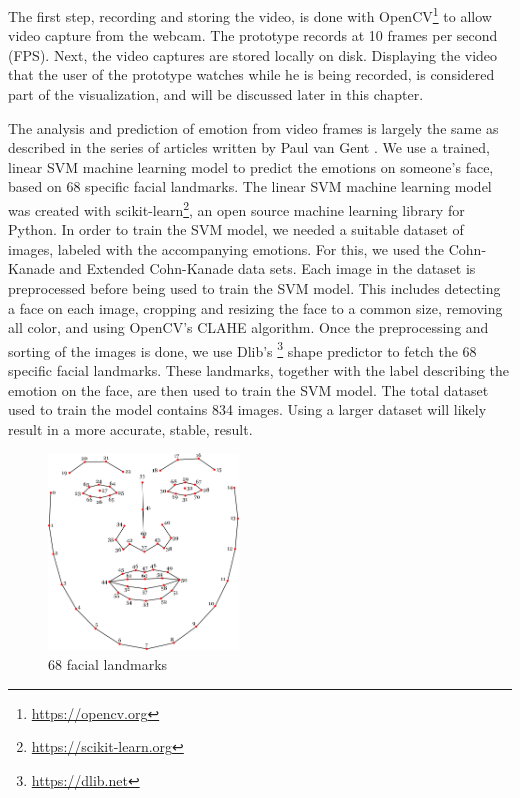 \documentclass[sigconf]{acmart}
\begin{document}
The first step, recording and storing the video, is done with OpenCV\footnote{\url{https://opencv.org}} 
to allow video capture from the webcam. The prototype records at 10 frames per second (FPS).
Next, the video captures are stored locally on disk.
Displaying the video that the user of the prototype watches while he is being recorded, is considered part of
the visualization, and will be discussed later in this chapter.

The analysis and prediction of emotion from video frames is largely the same as described in the series of
articles written by Paul van Gent \cite{gent2016landmarks}. We use a trained, linear SVM machine learning model
to predict the emotions on someone's face, based on 68 specific facial landmarks. The linear SVM machine learning
model was created with scikit-learn\footnote{\url{https://scikit-learn.org}}, an open source machine learning library
for Python. In order to train the SVM model, we needed a suitable dataset of images, labeled with the
accompanying emotions. For this, we used the Cohn-Kanade and Extended Cohn-Kanade 
\cite{kanade2000comprehensive, lucey2010extended} data sets.
Each image in the dataset is preprocessed before being used to train the SVM model. This includes detecting
a face on each image, cropping and resizing the face to a common size, removing all color, and using OpenCV's
CLAHE algorithm. Once the preprocessing and sorting of the images is done, we use Dlib's
\footnote{\url{https://dlib.net}} shape predictor to fetch the 68 specific facial landmarks. These landmarks,
together with the label describing the emotion on the face, are then used to train the SVM model. The total
dataset used to train the model contains 834 images. Using a larger dataset will likely result in a more accurate,
stable, result.

\begin{figure}[h]
    \centering
    \includegraphics[width=0.45\textwidth, scale=1]{landmarks.png}
    \caption{68 facial landmarks}
\end{figure}
\end{document}
